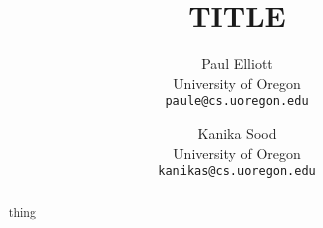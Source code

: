 \documentclass[conference,10pt]{IEEEtran}
\date{}
\begin{document}
\setcounter{page}{1}
\pagestyle{plain}


\title{TITLE}
\author{
{Paul Elliott}\\
University of Oregon\\
\texttt{paule@cs.uoregon.edu}
\and
{Kanika Sood}\\
University of Oregon\\
\texttt{kanikas@cs.uoregon.edu}
}

\maketitle
\begin{abstract}
    thing
\end{abstract}


\end{document}
